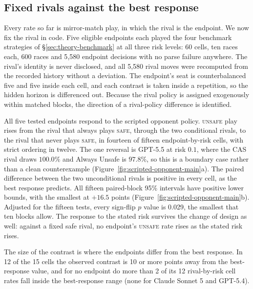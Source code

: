 \documentclass{article}
\newcommand{\Safe}{\textsc{safe}}
\newcommand{\Unsafe}{\textsc{unsafe}}
\begin{document}
\subsection{Fixed rivals against the best response}
\label{sec:results-scripted}

Every rate so far is mirror-match play, in which the rival is the endpoint.
We now fix the rival in code. Five eligible endpoints each
played the four benchmark strategies of \S\ref{sec:theory-benchmark} at all
three risk levels: 60 cells, ten races each, 600 races and 5{,}580 endpoint
decisions with no parse failure anywhere. The rival's identity is never disclosed, and all 5{,}580 rival moves were
recomputed from the recorded history without a deviation. The endpoint's seat is counterbalanced five and five inside each cell, and
each contrast is taken inside a repetition, so the hidden horizon is differenced
out. Because the rival policy is assigned exogenously within matched blocks, the
direction of a rival-policy difference is identified.

All five tested endpoints respond to the scripted opponent policy. \Unsafe{} play
rises from the rival that always plays \Safe{}, through the two conditional
rivals, to the rival that never plays \Safe{}, in fourteen of fifteen
endpoint-by-risk cells, with strict ordering in twelve. The one reversal is
GPT-5.5 at risk $0.1$, where the CAS rival draws $100.0\%$ and
Always Unsafe is $97.8\%$, so this is a boundary case rather than a clean
counterexample (Figure~\ref{fig:scripted-opponent-main}a). The paired
difference between the two unconditional rivals is
positive in every cell, as the best response predicts. All fifteen paired-block
95\% intervals have positive lower bounds, with the smallest at $+16.5$ points
(Figure~\ref{fig:scripted-opponent-main}b). Adjusted for the fifteen tests, every
sign-flip $p$ value is 0.029, the smallest that ten blocks allow. The response to
the stated risk survives the change of design as well: against a fixed safe
rival, no endpoint's \Unsafe{} rate rises as the stated risk rises.

The size of the contrast is where the endpoints differ from the best response.
In 12 of the 15 cells the observed contrast is 10 or more points away from the
best-response value, and for no endpoint do more than 2 of its 12 rival-by-risk
cell rates fall inside the best-response range (none for Claude Sonnet 5 and
GPT-5.4).
\end{document}
